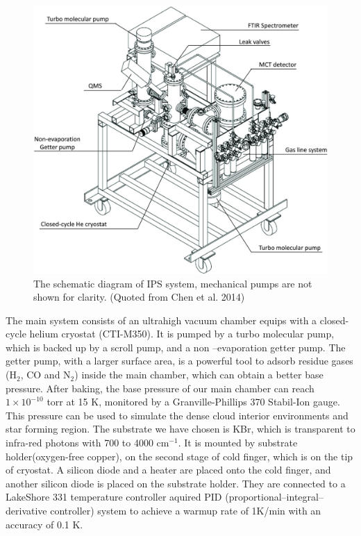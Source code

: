 \begin{figure}
\centering
\includegraphics[width=\textwidth]{figures/chapter2/system.jpg}
\caption{The schematic diagram of IPS system, mechanical pumps are not shown for clarity. (Quoted from Chen et al. 2014)}
\label{fig:system}
\end{figure}

The main system consists of an ultrahigh vacuum chamber equips with a closed-cycle helium cryostat (CTI-M350). It is pumped by a turbo molecular pump, which is backed up by a scroll pump, and a non –evaporation getter pump. The getter pump, with a larger surface area, is a powerful tool to adsorb residue gases (H$_2$, CO and N$_2$) inside the main chamber, which can obtain a better base pressure. After baking, the base pressure of our main chamber can reach $1 \times 10^{-10}$ torr at 15 K, monitored by a Granville-Phillips 370 Stabil-Ion gauge. This pressure can be used to simulate the dense cloud interior environments and star forming region. The substrate we have chosen is KBr, which is transparent to infra-red photons with 700 to 4000 cm$^{-1}$. It is mounted by substrate holder(oxygen-free copper), on the second stage of cold finger, which is on the tip of cryostat. A silicon diode and a heater are placed onto the cold finger, and another silicon diode is placed on the substrate holder. They are connected to a LakeShore 331 temperature controller aquired PID (proportional–integral–derivative controller) system to achieve a warmup rate of 1K/min with an accuracy of 0.1 K.

